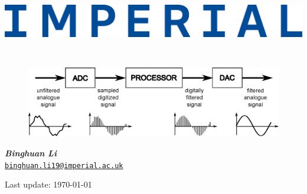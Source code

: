 \begin{titlepage}
\Large

\begin{minipage}{0.4\textwidth}
    \includegraphics[width=\textwidth]{images/Imperial.eps}
\end{minipage}

\vspace{1.5cm}

\begin{center}
        \vspace{2cm}
        {\Huge \textbf{\textit{\doc}}}\\
        \vspace{2cm}
        \begin{figure}[H]
            \centering
            \includegraphics[width=\textwidth]{images/DSP.eps}
        \end{figure}
        \vspace{2cm}
        \textit{\textbf{Binghuan Li}}\\
        \href{mailto:binghuan.li19@imperial.ac.uk}{\texttt{binghuan.li19@imperial.ac.uk}}

        \vspace{3cm}
        Last update: \today
        \vfill
\end{center}

\end{titlepage}